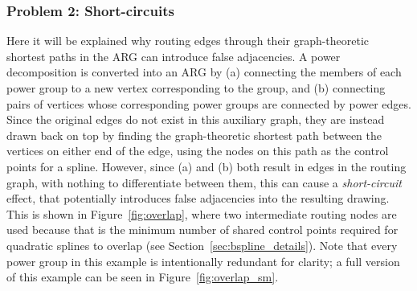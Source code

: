 \subsubsection{Problem 2: Short-circuits}
\label{sec:short_circuits}
Here it will be explained why routing edges through their graph-theoretic shortest paths in the ARG can introduce false adjacencies.
A power decomposition is converted into an ARG by (a) connecting the members of each power group to a new vertex corresponding to the group, and (b) connecting pairs of vertices whose corresponding power groups are connected by power edges.
Since the original edges do not exist in this auxiliary graph, they are instead drawn back on top by finding the graph-theoretic shortest path between the vertices on either end of the edge, using the nodes on this path as the control points for a spline.
However, since (a) and (b) both result in edges in the routing graph, with nothing to differentiate between them, this can cause a \emph{short-circuit} effect, that potentially introduces false adjacencies into the resulting drawing.
This is shown in Figure~\ref{fig:overlap}, where two intermediate routing nodes are used because that is the minimum number of shared control points required for quadratic splines to overlap (see Section~\ref{sec:bspline_details}).
Note that every power group in this example is intentionally redundant for clarity; a full version of this example can be seen in Figure~\ref{fig:overlap_sm}.


